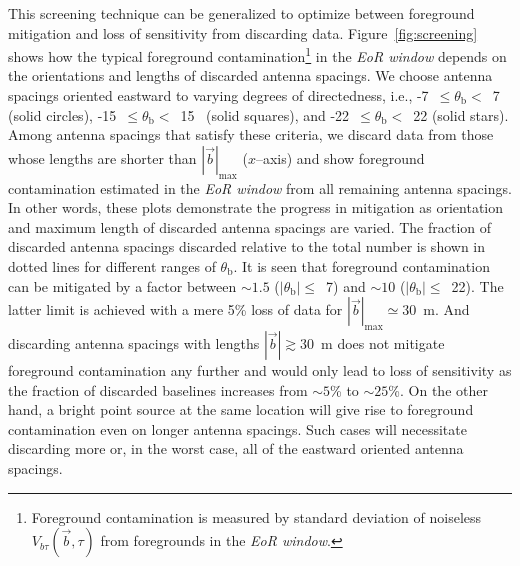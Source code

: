 \documentclass[preprint2,iop,numberedappendix]{emulateapj}
\begin{document}
This screening technique can be generalized to optimize between foreground mitigation and loss of sensitivity from discarding data. Figure~\ref{fig:screening} shows how the typical foreground contamination\footnote{Foreground contamination is measured by standard deviation of noiseless $V_{b\tau}(\vec{b},\tau)$ from foregrounds in the {\it EoR window}.} in the {\it EoR window} depends on the orientations and lengths of discarded antenna spacings. We choose antenna spacings oriented eastward to varying degrees of directedness, i.e., -7~$\le\theta_\textrm{b}<$~7 (solid circles), -15\arcdeg~$\le\theta_\textrm{b}<$~15\arcdeg~ (solid squares), and -22~$\le\theta_\textrm{b}<$~22 (solid stars). Among antenna spacings that satisfy these criteria, we discard data from those whose lengths are shorter than $|\vec{b}|_\textrm{max}$ ($x$--axis) and show foreground contamination estimated in the {\it EoR window} from all remaining antenna spacings. In other words, these plots demonstrate the progress in mitigation as orientation and maximum length of discarded antenna spacings are varied. %
The fraction of discarded antenna spacings discarded relative to the total number is shown in dotted lines for different ranges of $\theta_\textrm{b}$. It is seen that foreground contamination can be mitigated by a factor between $\sim 1.5$ ($|\theta_\textrm{b}|\le$~7) and $\sim 10$ ($|\theta_\textrm{b}|\le$~22). The latter limit is achieved with a mere 5\% loss of data for $|\vec{b}|_\textrm{max}\simeq30$~m. And discarding antenna spacings with lengths $|\vec{b}|\gtrsim 30$~m does not mitigate foreground contamination any further and would only lead to loss of sensitivity as the fraction of discarded baselines increases from $\sim 5$\% to $\sim 25$\%. On the other hand, a bright point source at the same location will give rise to foreground contamination even on longer antenna spacings. Such cases will necessitate discarding more or, in the worst case, all of the eastward oriented antenna spacings.
\end{document}
